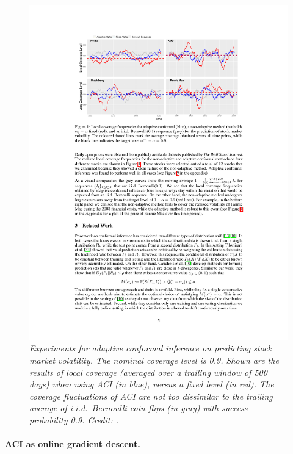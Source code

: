 \documentclass{article}
\begin{document}
\begin{figure}[htb]
\includegraphics[width=\textwidth]{stocks.pdf}
\caption{\it Experiments for adaptive conformal inference on predicting stock
  market volatility. The nominal coverage level is 0.9. Shown are the results of
  local coverage (averaged over a trailing window of 500 days) when using ACI
  (in blue), versus a fixed level (in red). The coverage fluctuations of ACI are
  not too dissimilar to the trailing average of i.i.d.\ Bernoulli coin flips (in
  gray) with success probability 0.9. Credit: \citet{gibbs2021adaptive}.}           
\label{fig:stocks}
\end{figure}

\paragraph{ACI as online gradient descent.}
\end{document}
